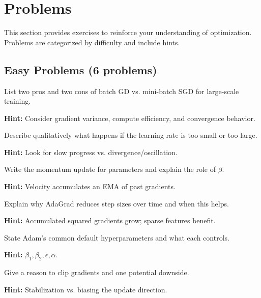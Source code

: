 
\section{Problems }
\label{sec:ch8-problems}

This section provides exercises to reinforce your understanding of optimization. Problems are categorized by difficulty and include hints.

\subsection{Easy Problems (6 problems)}

\begin{problem}
List two pros and two cons of batch GD vs. mini-batch SGD for large-scale training.

\textbf{Hint:} Consider gradient variance, compute efficiency, and convergence behavior.
\end{problem}

\begin{problem}
Describe qualitatively what happens if the learning rate is too small or too large.

\textbf{Hint:} Look for slow progress vs. divergence/oscillation.
\end{problem}

\begin{problem}
Write the momentum update for parameters and explain the role of $\beta$.

\textbf{Hint:} Velocity accumulates an EMA of past gradients.
\end{problem}

\begin{problem}
Explain why AdaGrad reduces step sizes over time and when this helps.

\textbf{Hint:} Accumulated squared gradients grow; sparse features benefit.
\end{problem}

\begin{problem}
State Adam's common default hyperparameters and what each controls.

\textbf{Hint:} $\beta_1,\beta_2,\epsilon,\alpha$.
\end{problem}

\begin{problem}
Give a reason to clip gradients and one potential downside.

\textbf{Hint:} Stabilization vs. biasing the update direction.
\end{problem}

